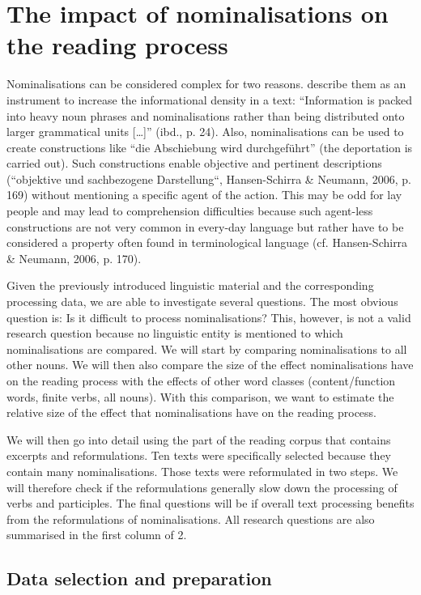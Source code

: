 \documentclass[output=paper]{langsci/langscibook}
\begin{document}
\section{\label{bkm:Ref283726002}The impact of nominalisations on the reading process}

Nominalisations can be considered complex for two reasons. \citet{HansenEtAl2006} describe them as an instrument to increase the informational density in a text: “Information is packed into heavy noun phrases and nominalisations rather than being distributed onto larger grammatical units […]” (ibd., p. 24). Also, nominalisations can be used to create constructions like “die Abschiebung wird durchgeführt” (the deportation is carried out). Such constructions enable objective and pertinent descriptions (“objektive und sachbezogene Darstellung“, Hansen-Schirra \& Neumann, 2006, p. 169) without mentioning a specific agent of the action. This may be odd for lay people and may lead to comprehension difficulties because such agent-less constructions are not very common in every-day language but rather have to be considered a property often found in terminological language (cf. Hansen-Schirra \& Neumann, 2006, p. 170). 

Given the previously introduced linguistic material and the corresponding processing data, we are able to investigate several questions. The most obvious question is: Is it difficult to process nominalisations? This, however, is not a valid research question because no linguistic entity is mentioned to which nominalisations are compared. We will start by comparing nominalisations to all other nouns. We will then also compare the size of the effect nominalisations have on the reading process with the effects of other word classes (content/function words, finite verbs, all nouns). With this comparison, we want to estimate the relative size of the effect that nominalisations have on the reading process.

We will then go into detail using the part of the reading corpus that contains excerpts and reformulations. Ten texts were specifically selected because they contain many nominalisations. Those texts were reformulated in two steps. We will therefore check if the reformulations generally slow down the processing of verbs and participles. The final questions will be if overall text processing benefits from the reformulations of nominalisations. All research questions are also summarised in the first column of 2.

\subsection{\label{bkm:Ref282241102}Data selection and preparation}
\end{document}

